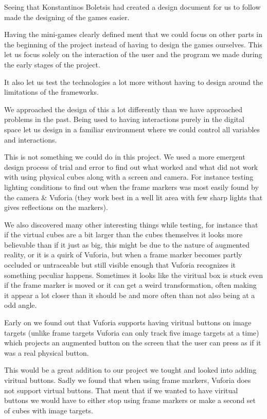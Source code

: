 Seeing that Konstantinos Boletsis had created a design document for us to follow made the designing of the games easier.


Having the mini-games clearly defined ment that we could focus on other parts in the beginning of the project instead of having to design the games ourselves.
This let us focus solely on the interaction of the user and the program we made during the early stages of the project.

It also let us test the technologies a lot more without having to design around the limitations of the frameworks.


We approached the design of this a lot differently than we have approached problems in the past.
Being used to having interactions purely in the digital space let us design in a familiar environment where we could control all variables and interactions.

This is not something we could do in this project. 
We used a more emergent design process of trial and error to find out what worked and what did not work with using physical cubes along with a screen and camera.
For instance testing lighting conditions to find out when the frame markers was most easily found by the camera \& Vuforia (they work best in a well lit area with few sharp lights that gives reflections on the markers).

We also discovered many other interesting things while testing, for instance that if the virtual cubes are a bit larger than the cubes themselves it looks more believable than if it just as big,
 this might be due to the nature of augmented reality, or it is a quirk of Vuforia, but when a frame marker becomes partly occluded or untraceable but still visible enough that Vuforia recognizes it something peculiar happens.
Sometimes it looks like the viritual box is stuck even if the frame marker is moved or it can get a weird transformation, often making it appear a lot closer than it should be and more often than not also being at a odd angle.


Early on we found out that Vuforia supports having viritual buttons on image targets (unlike frame targets Vuforia can only track five image targets at a time) which projects an augmented button on the screen that the user can press as if it was a real physical button.

This would be a great addition to our project we tought and looked into adding viritual buttons.
Sadly we found that when using frame markers, Vuforia does not support virtual buttons. That ment that if we wanted to have viritual buttons we would have to either stop using frame markers or make a second set of cubes with image targets.

